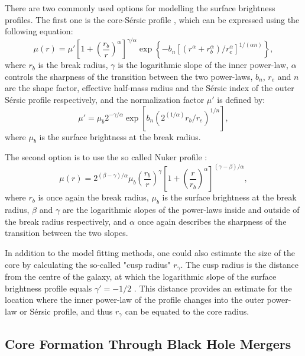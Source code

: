 \documentclass[english, oneside]{HYgradu}
\begin{document}
There are two commonly used options for modelling the surface brightness profiles. The first one is the core-Sérsic profile \citep{Graham2003}, which can be expressed using the following equation:
\begin{equation}
\mu(r) = \mu' \left[ 1 + \left( \frac{r_b}{r} \right)^\alpha \right]^{\gamma / \alpha} \exp \left\lbrace -b_n \left[ \left( r^\alpha + r_b^\alpha \right) / r_e^\alpha \right]^{1/(\alpha n)} \right\rbrace, \label{eq:core-sersic}
\end{equation}
where $r_b$ is the break radius, $\gamma$ is the logarithmic slope of the inner power-law, $\alpha$ controls the sharpness of the transition between the two power-laws, $b_n$, $r_e$ and $n$ are the shape factor, effective half-mass radius and the Sérsic index of the outer Sérsic profile respectively, and the normalization factor $\mu'$ is defined by:
\begin{equation}
\mu' = \mu_b 2^{-\gamma/\alpha} \exp \left[ b_n \left( 2^{(1/\alpha)} r_b/r_e \right)^{1/n} \right], 
\label{eq:mu_dot}
\end{equation}
where $\mu_b$ is the surface brightness at the break radius. 

The second option is to use the so called Nuker profile \citep{Lauer1995}:
\begin{equation}
\mu(r) = 2^{(\beta - \gamma) / \alpha} \mu_b \left( \frac{r_b}{r} \right)^\gamma \left[ 1 + \left( \frac{r}{r_b} \right)^\alpha \right]^{(\gamma - \beta)/\alpha},
\label{eq:nuker}
\end{equation}
where $r_b$ is once again the break radius, $\mu_b$ is the surface brightness at the break radius, $\beta$ and $\gamma$ are the logarithmic slopes of the power-laws inside and outside of the break radius respectively, and $\alpha$ once again describes the sharpness of the transition between the two slopes.

In addition to the model fitting methods, one could also estimate the size of the core by calculating the so-called "cusp radius" $r_\gamma$. The cusp radius is the distance from the centre of the galaxy, at which the logarithmic slope of the surface brightness profile equals $\gamma' = -1/2$ \citep{Carollo1997, Lauer2007Cusp}. This distance provides an estimate for the location where the inner power-law of the profile changes into the outer power-law or Sérsic profile, and thus $r_\gamma$ can be equated to the core radius. 

\subsection{Core Formation Through Black Hole Mergers}
\end{document}
